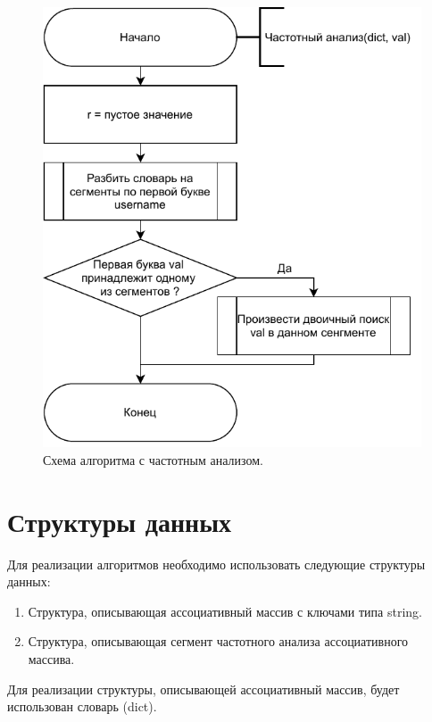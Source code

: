 \documentclass[12pt]{report}
\begin{document}
	\newpage
	\begin{figure}[H]
		\begin{center}
			\includegraphics[scale=0.8]{img/freq_scheme.pdf}
			\caption{Схема алгоритма с частотным анализом.}
			\label{fig:alg3}
		\end{center}
	\end{figure}
	
	\section{Структуры данных}

	Для реализации алгоритмов необходимо использовать следующие структуры данных:
	
	\begin{enumerate}
		\item Структура, описывающая ассоциативный массив с ключами типа string.
		\item Структура, описывающая сегмент частотного анализа ассоциативного массива.
	\end{enumerate}
	
	Для реализации структуры, описывающей ассоциативный массив, будет использован словарь (dict).
	
\end{document}
